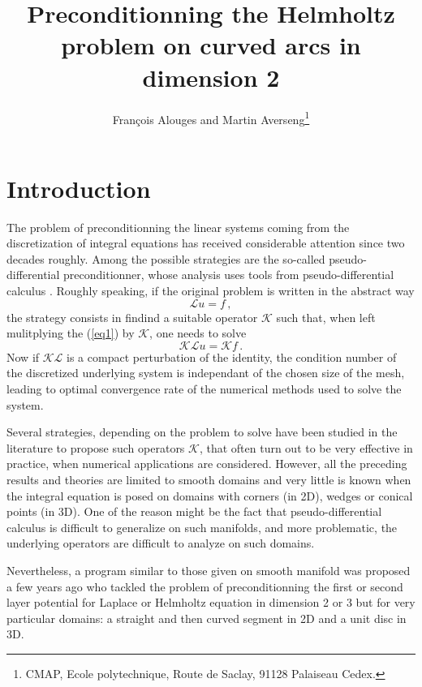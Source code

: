\documentclass[a4paper]{article}
\title{Preconditionning the Helmholtz problem on curved arcs in dimension 2}
\author{Fran\c{c}ois Alouges and Martin Averseng\footnote{CMAP, Ecole polytechnique, Route de Saclay, 91128 Palaiseau Cedex.}}
\begin{document}
	\maketitle
	
	\begin{abstract}
	\end{abstract}
	
	\section{Introduction}
	The problem of preconditionning the linear systems coming from the discretization of integral equations
	has received considerable attention since two decades roughly. Among the possible strategies are the so-called 
	pseudo-differential preconditionner, whose analysis uses tools from pseudo-differential calculus \cite{Christiansen,Nedelec,Levadoux,DarbasAntoine}. Roughly speaking, if the original problem is written in the abstract way
	\begin{equation}
	\mathcal{L}u=f\,,
	\label{eq1}
	\end{equation}
	the strategy consists in findind a suitable operator $\mathcal{K}$ such
	that, when left mulitplying the (\ref{eq1}) by $\mathcal{K}$, one needs to solve
	\begin{equation}
	\mathcal{K}\mathcal{L}u=\mathcal{K}f\,.
	\end{equation}
	Now if $\mathcal{K}\mathcal{L}$ is a compact perturbation of the identity, the condition number of the discretized underlying
	system is independant of the chosen size of the mesh, leading to optimal convergence rate of the numerical methods used to solve the system.
	
	Several strategies, depending on the problem to solve have been studied in the literature \cite{} to propose such operators $\mathcal{K}$, that often turn out to be very effective in practice, when numerical applications are considered.
	However, all the preceding results and theories are limited to smooth domains and very little is known when the integral equation 
	is posed on domains with corners (in 2D), wedges or conical points (in 3D). One of the reason might be the fact that 
	pseudo-differential calculus is difficult to generalize on such manifolds, and more problematic, the underlying operators
	are difficult to analyze on such domains.
	
	Nevertheless, a program similar to those given on smooth manifold was proposed a few years ago \cite{Bruno,Nedelec,Jerez,Hiptmair} who tackled the problem of preconditionning the first or second layer potential
	for Laplace or Helmholtz equation in dimension 2 or 3 but for very particular domains: a straight and then curved segment in 2D and a unit disc in 3D.
	
\end{document}
